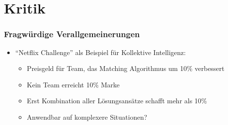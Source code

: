 \section{Kritik}
\begin{frame}
	\frametitle{Fragwürdige Verallgemeinerungen}
	\begin{itemize}
		\item
			\enquote{Netflix Challenge} als Beispiel für Kollektive Intelligenz:
			\begin{itemize}
				\item
					Preisgeld für Team, das Matching Algorithmus um 10\% verbessert
				\item
					Kein Team erreicht 10\% Marke
				\item
					Erst Kombination aller Lösungsansätze schafft mehr als 10\%
				\item
					Anwendbar auf komplexere Situationen?
			\end{itemize}
	\end{itemize}
\end{frame}
